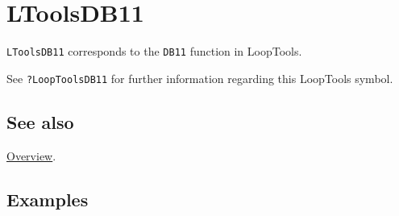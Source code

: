 \documentclass[../FeynHelpersManual.tex]{subfiles}
\begin{document}
\hypertarget{ltoolsdb11}{
\section{LToolsDB11}\label{ltoolsdb11}}

\texttt{LToolsDB11} corresponds to the \texttt{DB11} function in
LoopTools.

See \texttt{?LoopTools\textasciigrave DB11} for further information
regarding this LoopTools symbol.

\subsection{See also}

\hyperlink{toc}{Overview}.

\subsection{Examples}
\end{document}
